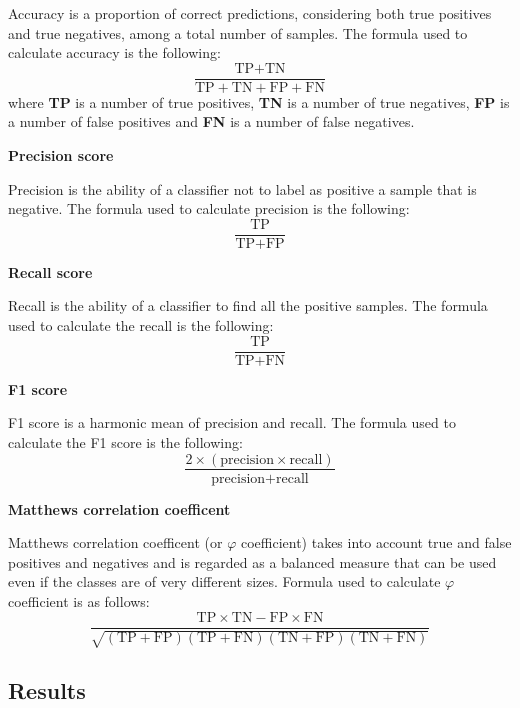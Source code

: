 Accuracy is a proportion of correct predictions, considering both true positives and true negatives, among a total number of samples. The formula used to calculate accuracy is the following:
\begin{equation}
  \frac{\text{TP} + \text{TN}}{\text{TP} + \text{TN} + \text{FP} + \text{FN}}
\end{equation}
where \textbf{TP} is a number of true positives, \textbf{TN} is a number of true negatives, \textbf{FP} is a number of false positives and \textbf{FN} is a number of false negatives.

\textbf{Precision score}

Precision is the ability of a classifier not to label as positive a sample that is negative. The formula used to calculate precision is the following:
\begin{equation}
  \frac{\text{TP}}{\text{TP} + \text{FP}}
\end{equation}

\textbf{Recall score}

Recall is the ability of a classifier to find all the positive samples. The formula used to calculate the recall is the following:
\begin{equation}
  \frac{\text{TP}}{\text{TP} + \text{FN}}
\end{equation}

\textbf{F1 score}

F1 score is a harmonic mean of precision and recall. The formula used to calculate the F1 score is the following:
\begin{equation}
  \frac{ 2 \times (\text{precision} \times \text{recall})}{\text{precision} + \text{recall}}
\end{equation}

\textbf{Matthews correlation coefficent}

Matthews correlation coefficent (or $\varphi$ coefficient) takes into account true and false positives and negatives and is regarded as a balanced measure that can be used even if the classes are of very different sizes. Formula used to calculate $\varphi$ coefficient is as follows:
\begin{equation}
  \frac{\text{TP} \times \text{TN} - \text{FP} \times \text{FN}}{\sqrt{(\text{TP} + \text{FP})(\text{TP} + \text{FN})(\text{TN} + \text{FP})(\text{TN} + \text{FN})}}
\end{equation}

\subsection{Results}

